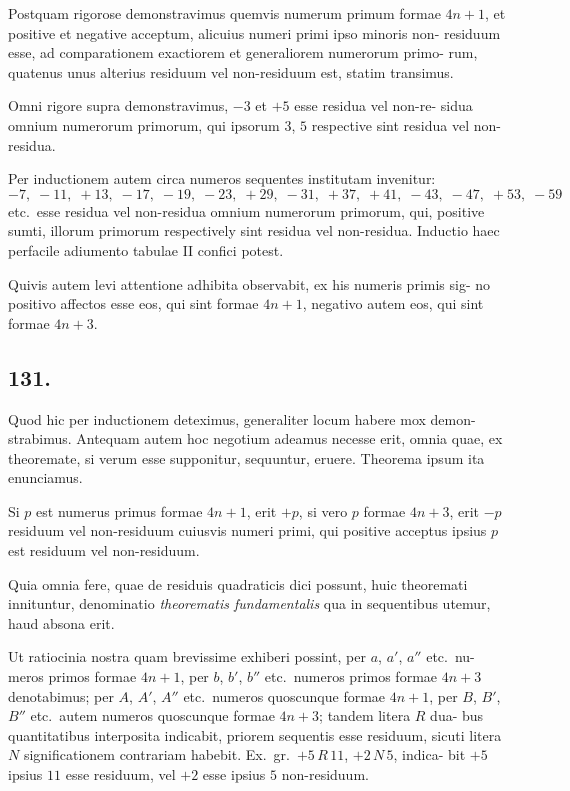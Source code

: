 \documentclass[12pt,a4paper]{article}
\theoremstyle{plain}
\theoremstyle{definition}
\theoremstyle{remark}
\begin{document}
Postquam rigorose demonstravimus quemvis numerum primum formae
$4n+1$, et positive et negative acceptum, alicuius numeri primi ipso minoris non-
residuum esse, ad comparationem exactiorem et generaliorem numerorum primo-
rum, quatenus unus alterius residuum vel non-residuum est, statim transimus.

Omni rigore supra demonstravimus, $-3$ et $+5$ esse residua vel non-re-
sidua omnium numerorum primorum, qui ipsorum $3$, $5$ respective sint residua vel
non-residua.

Per inductionem autem circa numeros sequentes institutam invenitur:
\[
-7,\; -11,\; +13,\; -17,\; -19,\; -23,\; +29,\; -31,\; +37,\; +41,\; -43,\; -47,\; +53,\; -59
\]
etc.\ esse residua vel non-residua omnium numerorum primorum, qui, positive
sumti, illorum primorum respectively sint residua vel non-residua. Inductio haec
perfacile adiumento tabulae II confici potest.

Quivis autem levi attentione adhibita observabit, ex his numeris primis sig-
no positivo affectos esse eos, qui sint formae $4n+1$, negativo autem eos, qui
sint formae $4n+3$.

\subsection*{131.}

Quod hic per inductionem deteximus, generaliter locum habere mox demon-
strabimus. Antequam autem hoc negotium adeamus necesse erit, omnia quae,
ex theoremate, si verum esse supponitur, sequuntur, eruere. Theorema ipsum ita
enunciamus.

Si $p$ est numerus primus formae $4n+1$, erit $+p$, si vero $p$ formae
$4n+3$, erit $-p$ residuum vel non-residuum cuiusvis numeri primi, qui positive
acceptus ipsius $p$ est residuum vel non-residuum.

Quia omnia fere, quae de residuis quadraticis dici possunt, huic theoremati
innituntur, denominatio \emph{theorematis fundamentalis} qua in sequentibus utemur,
haud absona erit.

Ut ratiocinia nostra quam brevissime exhiberi possint, per $a$, $a'$, $a''$ etc.\ nu-
meros primos formae $4n+1$, per $b$, $b'$, $b''$ etc.\ numeros primos formae $4n+3$
denotabimus; per $A$, $A'$, $A''$ etc.\ numeros quoscunque formae $4n+1$, per
$B$, $B'$, $B''$ etc.\ autem numeros quoscunque formae $4n+3$; tandem litera $R$ dua-
bus quantitatibus interposita indicabit, priorem sequentis esse residuum, sicuti
litera $N$ significationem contrariam habebit. Ex.~gr.\ $+5 \, R \, 11$, $+2 \, N \, 5$, indica-
bit $+5$ ipsius $11$ esse residuum, vel $+2$ esse ipsius $5$ non-residuum.
\end{document}
